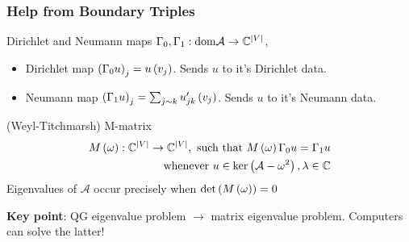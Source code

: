 \documentclass{beamer}
\begin{document}
\begin{frame}
	\frametitle{Help from Boundary Triples}

	\begin{block}{Dirichlet and Neumann maps}
		$\Gamma_0, \Gamma_1 : \mathrm{dom}\mathcal{A} \rightarrow \mathbb{C}^{\lvert V \rvert}$,
		\begin{itemize}
			\item Dirichlet map $\left( \Gamma_0 u \right)_j = u\left( v_j \right)$. Sends $u$ to it's Dirichlet data.
			\item Neumann map $\left( \Gamma_1 u \right)_j = \sum_{j\sim k}u_{jk}'\left( v_j \right)$. Sends $u$ to it's Neumann data.
		\end{itemize}
	\end{block}
	
	\begin{block}{	(Weyl-Titchmarsh) M-matrix}
		\begin{align*}
			M\left( \omega \right) :\mathbb{C}^{\lvert V \rvert} \rightarrow\mathbb{C}^{\lvert V \rvert}, \text{ such that }
			M\left( \omega \right) \Gamma_0 u = \Gamma_1 u \\
			\text{whenever } u\in\mathrm{ker}\left( \mathcal{A}-\omega^2 \right), \lambda\in\mathbb{C}
		\end{align*}
		Eigenvalues of $\mathcal{A}$ occur precisely when $\mathrm{det}\left( M\left( \omega \right) \right)=0$
	\end{block}

	\textbf{Key point}: QG eigenvalue problem $\rightarrow$ matrix eigenvalue problem.
	Computers can solve the latter!
\end{frame}
\end{document}
